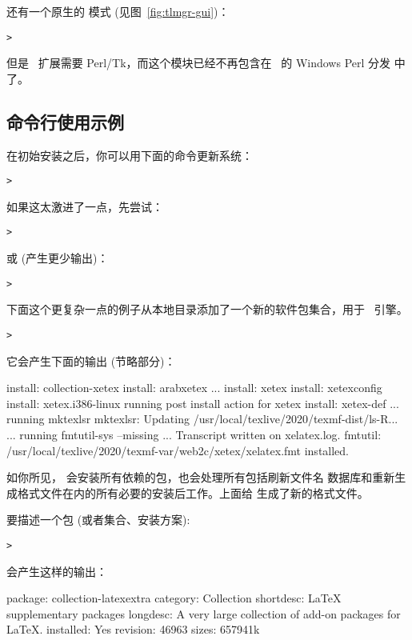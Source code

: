 \documentclass{article}
\begin{document}
 还有一个原生的 \GUI{} 模式 (见图~\ref{fig:tlmgr-gui})：
\begin{alltt}
  > 
\end{alltt}
但是 \GUI\ 扩展需要 Perl/Tk，而这个模块已经不再包含在 \TL\ 的 Windows Perl 分发
中了。

\subsection{ 命令行使用示例}

在初始安装之后，你可以用下面的命令更新系统：
\begin{alltt}
  > 
\end{alltt}
如果这太激进了一点，先尝试：
\begin{alltt}
  > 
\end{alltt}
或 (产生更少输出)：
\begin{alltt}
  > 
\end{alltt}

下面这个更复杂一点的例子从本地目录添加了一个新的软件包集合，用于 \XeTeX\ 引擎。

\begin{alltt}
  > 
\end{alltt}
它会产生下面的输出 (节略部分)：
\begin{fverbatim}
  install: collection-xetex
  install: arabxetex
  ...
  install: xetex
  install: xetexconfig
  install: xetex.i386-linux
  running post install action for xetex
  install: xetex-def
  ...
  running mktexlsr
  mktexlsr: Updating /usr/local/texlive/2020/texmf-dist/ls-R...
  ...
  running fmtutil-sys --missing
  ...
  Transcript written on xelatex.log.
  fmtutil: /usr/local/texlive/2020/texmf-var/web2c/xetex/xelatex.fmt installed.
\end{fverbatim}

如你所见， 会安装所有依赖的包，也会处理所有包括刷新文件名
数据库和重新生成格式文件在内的所有必要的安装后工作。上面给 \XeTeX{}
生成了新的格式文件。

要描述一个包 (或者集合、安装方案):
\begin{alltt}
  > 
\end{alltt}
会产生这样的输出：
\begin{fverbatim}
  package:    collection-latexextra
  category:   Collection
  shortdesc:  LaTeX supplementary packages
  longdesc:   A very large collection of add-on packages for LaTeX.
  installed:  Yes
  revision:   46963
  sizes:      657941k
\end{fverbatim}
\end{document}

